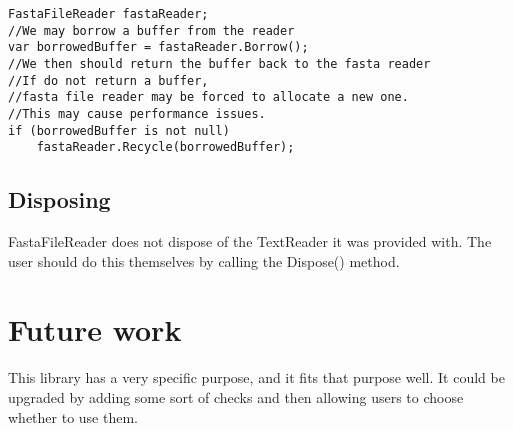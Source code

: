 \begin{lstlisting}
FastaFileReader fastaReader;
//We may borrow a buffer from the reader 
var borrowedBuffer = fastaReader.Borrow();
//We then should return the buffer back to the fasta reader
//If do not return a buffer,
//fasta file reader may be forced to allocate a new one.
//This may cause performance issues.
if (borrowedBuffer is not null) 
    fastaReader.Recycle(borrowedBuffer);
\end{lstlisting}
\subsection{Disposing}
FastaFileReader does not dispose of the TextReader it was provided with. The user should do this themselves by calling the Dispose() method.

\section{Future work}
This library has a very specific purpose, and it fits that purpose well. It could be upgraded by adding some sort of checks and then allowing users to choose whether to use them. 

    